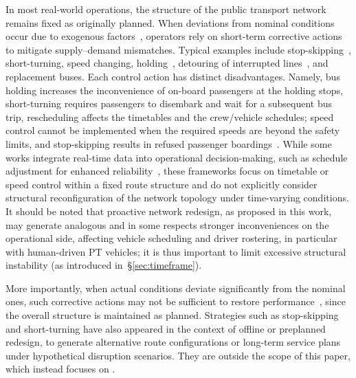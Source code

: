 \documentclass[a4paper,fleqn]{cas-sc}
\begin{document}
In most real-world operations, the structure of the public transport network remains fixed as originally planned. 
When deviations from nominal conditions occur due to exogenous factors~\citep{nissen2020does, chen2009analyzing}, 
operators rely on short-term corrective actions to mitigate supply--demand mismatches.
Typical examples include stop-skipping~\citep{peled2021quality}, short-turning, 
speed changing, holding~\citep{tang2018optimal, manasra2019optimization, gkiotsalitis2020public, olvera2023holding}, 
detouring of interrupted lines~\citep{zheng2023multi}, and replacement buses.
Each control action has distinct disadvantages.
Namely, bus holding increases the inconvenience of on-board passengers at the holding stops, short-turning requires passengers to disembark and wait for a subsequent bus trip, rescheduling affects the timetables and the crew/vehicle schedules; speed control cannot be implemented when the required speeds are beyond the safety limits, and stop-skipping results in refused passenger boardings~\citep{gkiotsalitis2021stop}.
While some works integrate real-time data into operational decision-making, such as schedule adjustment for enhanced reliability~\citep{cao2019real}, these frameworks focus on timetable or speed control within a fixed route structure and do not explicitly consider structural reconfiguration of the network topology under time-varying conditions.
It should be noted that proactive network redesign, as proposed in this work, may generate analogous and in some respects stronger inconveniences on the operational side, affecting vehicle scheduling and driver rostering, in particular with human-driven PT vehicles; it is thus important to limit excessive structural instability (as introduced in~\S{}\ref{sec:timeframe}).

More importantly, when actual conditions deviate significantly from the nominal ones, such corrective actions may not be sufficient to restore performance~\citep{guo2024restoring}, since the overall structure is maintained as planned.
%
Strategies such as stop-skipping and short-turning have also appeared in the context of offline or preplanned redesign, to generate alternative route configurations or long-term service plans under hypothetical disruption scenarios. They are outside the scope of this paper, which instead focuses on .
\end{document}
